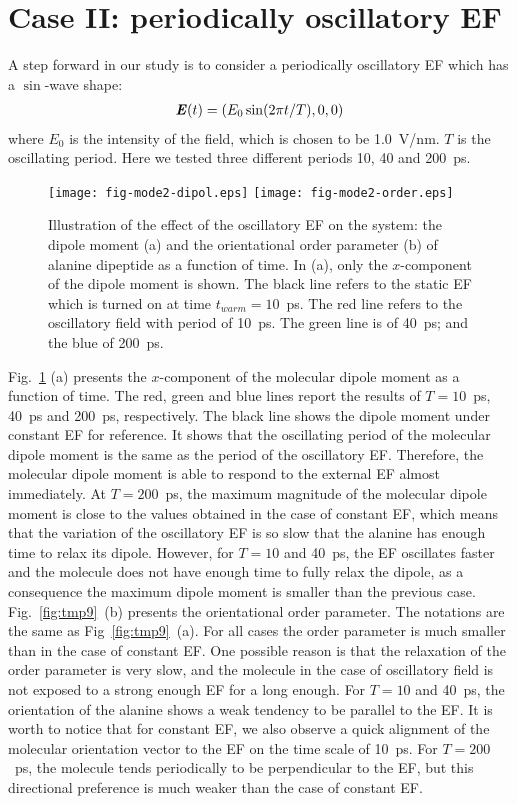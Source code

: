 \documentclass[a4paper,preprint,unsortedaddress,onecolumn]{revtex4-1}
\newcommand{\vect}[1]{\textbf{\textit{#1}}}
\begin{document}
\section{Case II:
  periodically oscillatory EF}
A step forward in our study is to consider a periodically oscillatory EF which has
a $\sin$-wave shape:
\begin{align}
  \vect E(t) = (E_0\sin(2\pi t / T), 0, 0)
\end{align}
where $E_0$ is the intensity of the field, which is chosen to be
1.0~V/nm.  $T$ is the oscillating period.
Here we tested three different
periods 10, 40 and 200~ps.
\begin{figure}
  \centering
  \texttt{[image: fig-mode2-dipol.eps]}
  \texttt{[image: fig-mode2-order.eps]}
  \caption{Illustration of the effect of the oscillatory EF on the system:
    the dipole moment (a) and the
    orientational order parameter (b) of alanine dipeptide as a
    function of time. In (a),
    only the $x$-component of the dipole moment is
    shown. The black line refers to the static EF which is turned on
    at time $t_{warm} = 10$~ps. The red line refers to the oscillatory field with period of
    10~ps. The green line is of 40~ps; and the blue of 200~ps.}
  \label{fig:tmp8}
\end{figure}
Fig.~\ref{fig:tmp8} (a)
presents the $x$-component of the molecular dipole moment as
a function of time. The red, green and blue lines report the
results of $T=10$~ps, 40~ps and 200~ps, respectively. The black line
shows the dipole moment under constant EF
for reference.
It shows that the oscillating period of the molecular dipole moment
is the same as the period of the oscillatory EF. Therefore,
the molecular dipole moment
is able to respond to the external EF almost immediately.
At $T=200$~ps, the maximum magnitude of the molecular
dipole moment is close to the values obtained in the case of constant EF, which
means that the variation of the oscillatory EF is so slow that the
alanine has enough time to 
relax its dipole. However,
for $T=10$ and 40~ps, the EF oscillates faster and the molecule 
does not have enough time to fully relax the dipole, as a consequence the maximum dipole moment is smaller than the previous case.
Fig.~\ref{fig:tmp9}~(b) presents the orientational order
parameter. The notations are the same as Fig~\ref{fig:tmp9}~(a).
For all cases the order parameter is much
smaller than in the case of constant EF. One possible reason is that the
relaxation of the order parameter is very slow, and the molecule in the case of oscillatory field is
not exposed to a strong enough EF for a long enough.
For  $T=10$ and 40~ps, the orientation of the alanine shows a weak tendency
to be parallel to the EF. It is worth to notice that for constant EF,
we also observe a quick alignment of the molecular orientation vector to the EF
on the time scale of 10~ps. For $T=200$~ps, the molecule tends periodically
to be perpendicular to the EF, but this directional preference is much
weaker than the case of constant EF.
\end{document}
